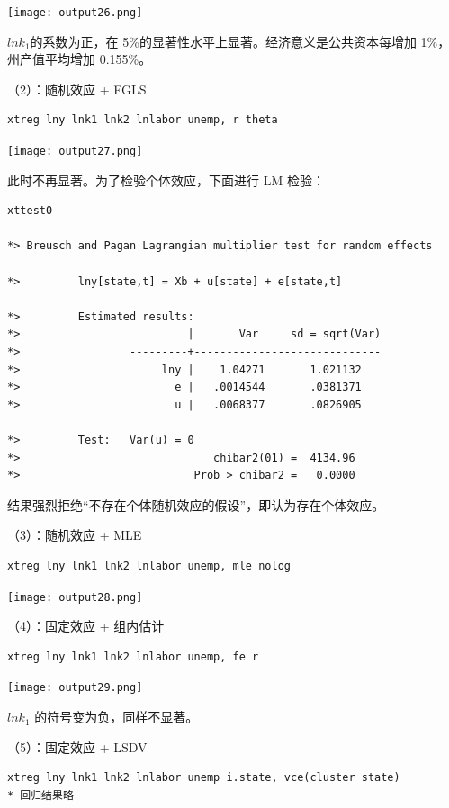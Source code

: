 \documentclass[cn,fancy,blue,11pt]{elegantbook}
\begin{document}
\noindent\texttt{[image: output26.png]}

\(lnk_1\)的系数为正，在 5\%的显著性水平上显著。经济意义是公共资本每增加 1\%，州产值平均增加 0.155\%。

（2）：随机效应 + FGLS

\begin{lstlisting}
xtreg lny lnk1 lnk2 lnlabor unemp, r theta
\end{lstlisting}

\noindent\texttt{[image: output27.png]}

此时不再显著。为了检验个体效应，下面进行 LM 检验：

\begin{lstlisting}
xttest0

*> Breusch and Pagan Lagrangian multiplier test for random effects

*>         lny[state,t] = Xb + u[state] + e[state,t]

*>         Estimated results:
*>                          |       Var     sd = sqrt(Var)
*>                 ---------+-----------------------------
*>                      lny |    1.04271       1.021132
*>                        e |   .0014544       .0381371
*>                        u |   .0068377       .0826905

*>         Test:   Var(u) = 0
*>                              chibar2(01) =  4134.96
*>                           Prob > chibar2 =   0.0000
\end{lstlisting}

结果强烈拒绝``不存在个体随机效应的假设''，即认为存在个体效应。

（3）：随机效应 + MLE

\begin{lstlisting}
xtreg lny lnk1 lnk2 lnlabor unemp, mle nolog
\end{lstlisting}

\noindent\texttt{[image: output28.png]}

（4）：固定效应 + 组内估计

\begin{lstlisting}
xtreg lny lnk1 lnk2 lnlabor unemp, fe r
\end{lstlisting}

\noindent\texttt{[image: output29.png]}

\(lnk_1\) 的符号变为负，同样不显著。

（5）：固定效应 + LSDV

\begin{lstlisting}
xtreg lny lnk1 lnk2 lnlabor unemp i.state, vce(cluster state)
* 回归结果略
\end{lstlisting}
\end{document}
